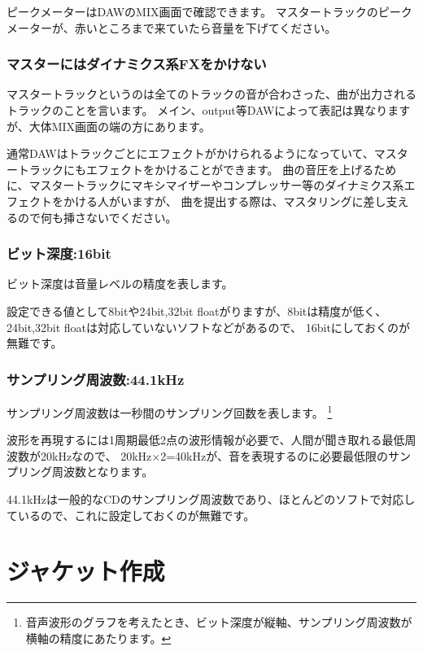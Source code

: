 \documentclass[11pt,a4paper]{jsarticle}
\begin{document}
                ピークメーターはDAWのMIX画面で確認できます。
                マスタートラックのピークメーターが、赤いところまで来ていたら音量を下げてください。

            \subsubsection{マスターにはダイナミクス系FXをかけない}
                マスタートラックというのは全てのトラックの音が合わさった、曲が出力されるトラックのことを言います。
                メイン、output等DAWによって表記は異なりますが、大体MIX画面の端の方にあります。

                通常DAWはトラックごとにエフェクトがかけられるようになっていて、マスタートラックにもエフェクトをかけることができます。
                曲の音圧を上げるために、マスタートラックにマキシマイザーやコンプレッサー等のダイナミクス系エフェクトをかける人がいますが、
                曲を提出する際は、マスタリングに差し支えるので何も挿さないでください。

            \subsubsection{ビット深度:16bit}
                ビット深度は音量レベルの精度を表します。
                
                設定できる値として8bitや24bit,32bit floatがりますが、8bitは精度が低く、24bit,32bit floatは対応していないソフトなどがあるので、
                16bitにしておくのが無難です。

            \subsubsection{サンプリング周波数:44.1kHz}
                サンプリング周波数は一秒間のサンプリング回数を表します。
                \footnote{音声波形のグラフを考えたとき、ビット深度が縦軸、サンプリング周波数が横軸の精度にあたります。}
                
                波形を再現するには1周期最低2点の波形情報が必要で、人間が聞き取れる最低周波数が20kHzなので、
                20kHz×2=40kHzが、音を表現するのに必要最低限のサンプリング周波数となります。
                
                44.1kHzは一般的なCDのサンプリング周波数であり、ほとんどのソフトで対応しているので、これに設定しておくのが無難です。
    
    \section{ジャケット作成}
\end{document}
